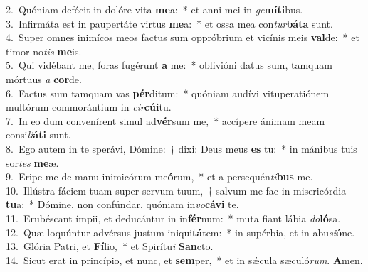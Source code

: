 {2.~}Quóniam defécit in dolóre vita \textbf{me}a:~* et anni mei in \textit{ge}\textbf{mí}\textbf{ti}bus.\\
{3.~}Infirmáta est in paupertáte virtus \textbf{me}a:~* et ossa mea con\textit{tur}\textbf{bá}\textbf{ta} sunt.\\
{4.~}Super omnes inimícos meos factus sum oppróbrium et vicínis meis \textbf{val}de:~* et timor no\textit{tis} \textbf{me}is.\\
{5.~}Qui vidébant me, foras fugérunt \textbf{a} me:~* oblivióni datus sum, tamquam mórtuus \textit{a} \textbf{cor}de.\\
{6.~}Factus sum tamquam vas \textbf{pér}ditum:~* quóniam audívi vituperatiónem multórum commorántium in \textit{cir}\textbf{cú}\textbf{i}tu.\\
{7.~}In eo dum convenírent simul ad\textbf{vér}sum me,~* accípere ánimam meam consi\textit{li}\textbf{á}\textbf{ti} sunt.\\
{8.~}Ego autem in te sperávi, Dómine:~† dixi: Deus meus \textbf{es} tu:~* in mánibus tuis sor\textit{tes} \textbf{me}æ.\\
{9.~}Eripe me de manu inimicórum me\textbf{ó}rum,~* et a persequén\textit{ti}\textbf{bus} me.\\
{10.~}Illústra fáciem tuam super servum tuum,~† salvum me fac in misericórdia \textbf{tu}a:~* Dómine, non confúndar, quóniam in\textit{vo}\textbf{cá}\textbf{vi} te.\\
{11.~}Erubéscant ímpii, et deducántur in in\textbf{fér}num:~* muta fiant lábia \textit{do}\textbf{ló}sa.\\
{12.~}Quæ loquúntur advérsus justum iniqui\textbf{tá}tem:~* in supérbia, et in abu\textit{si}\textbf{ó}ne.\\
{13.~}Glória Patri, et \textbf{Fí}lio,~* et Spirítu\textit{i} \textbf{San}cto.\\
{14.~}Sicut erat in princípio, et nunc, et \textbf{sem}per,~* et in sǽcula sæculó\textit{rum}. \textbf{A}men.\\
